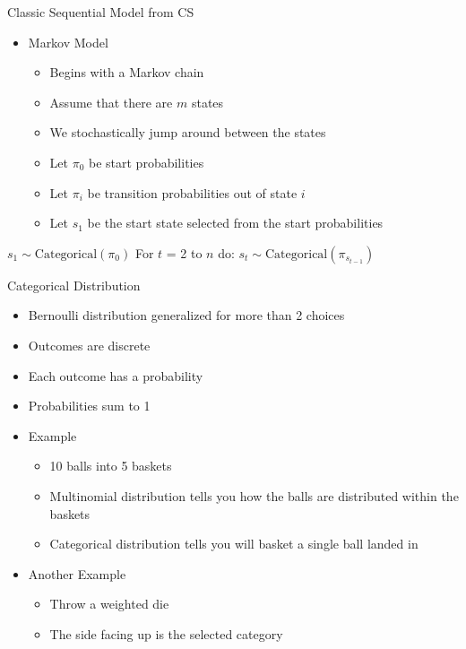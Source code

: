 \documentclass[aspectratio=169]{beamer}
\begin{document}
\begin{frame}[fragile]{Classic Sequential Model from CS}

\begin{itemize}
\item Markov Model
	\begin{itemize}
	\item Begins with a Markov chain
	\item Assume that there are $m$ states
	\item We stochastically jump around between the states
	\item Let $\pi_0$ be  start probabilities
	\item Let $\pi_i$ be transition probabilities out of state $i$
	\item Let $s_1$ be the start state selected from the start probabilities
	\end{itemize}
\end{itemize}
\begin{SQL}
$s_1 \sim \textrm{Categorical}(\pi_0)$
For $t$ = 2 to $n$ do:
  $s_t \sim \textrm{Categorical}(\pi_{s_{t - 1}})$
\end{SQL}

\end{frame}
\begin{frame}{Categorical Distribution}

\begin{itemize}
	\item Bernoulli distribution generalized for more than 2 choices
	\item Outcomes are discrete
	\item Each outcome has a probability
	\item Probabilities sum to 1
	\item Example
		\begin{itemize}
			\item 10 balls into 5 baskets
			\item Multinomial distribution tells you how the balls are distributed within the baskets
			\item Categorical distribution tells you will basket a single ball landed in
		\end{itemize}
	\item Another Example
		\begin{itemize}
			\item Throw a weighted die
			\item The side facing up is the selected category
		\end{itemize}
\end{itemize}

\end{frame}
\end{document}
